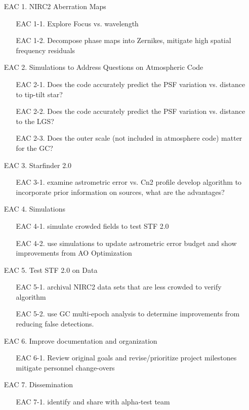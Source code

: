 \begin{itemize}
\item[EAC 1.] NIRC2 Aberration Maps
  \begin{itemize}
  \item[EAC 1-1.] Explore Focus vs. wavelength
  \item[EAC 1-2.] Decompose phase maps into Zernikes, mitigate high spatial
    frequency residuals
  \end{itemize}
\item[EAC 2.] Simulations to Address Questions on Atmospheric Code
  \begin{itemize}
  \item[EAC 2-1.] Does the code accurately predict the PSF variation
    vs. distance to tip-tilt star?
  \item[EAC 2-2.] Does the code accurately predict the PSF variation
    vs. distance to the LGS?
  \item[EAC 2-3.] Does the outer scale (not included in atmosphere code) matter
    for the GC?
  \end{itemize}
\item[EAC 3.] Starfinder 2.0
  \begin{itemize}
  \item[EAC 3-1.] examine astrometric error vs. Cn2 profile develop algorithm to
    incorporate prior information on sources, what are the advantages?
  \end{itemize}
\item[EAC 4.] Simulations
  \begin{itemize}
  \item[EAC 4-1.] simulate crowded fields to test STF 2.0
  \item[EAC 4-2.] use simulations to update astrometric error budget and show
    improvements from AO Optimization
  \end{itemize}
\item[EAC 5.] Test STF 2.0 on Data
  \begin{itemize}
  \item[EAC 5-1.] archival NIRC2 data sets that are less crowded to verify algorithm
  \item[EAC 5-2.] use GC multi-epoch analysis to determine improvements from
    reducing false detections.
  \end{itemize}
\item[EAC 6.] Improve documentation and organization
  \begin{itemize}
  \item[EAC 6-1.] Review original goals and revise/prioritize project milestones
    mitigate personnel change-overs
  \end{itemize}
\item[EAC 7.] Dissemination
  \begin{itemize}
  \item[EAC 7-1.] identify and share with alpha-test team
  \end{itemize}
\end{itemize}
